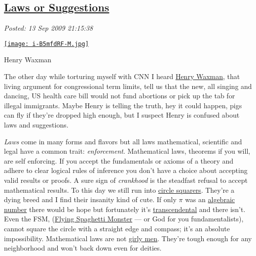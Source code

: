 %

\subsection*{\href{https://bakerjd99.wordpress.com/2009/09/13/laws-or-suggestions/}{Laws or Suggestions}}


\noindent\emph{Posted: 13 Sep 2009 21:15:38}
\vspace{6pt}


\captionsetup[floatingfigure]{labelformat=empty}
\begin{floatingfigure}[l]{0.25\textwidth}
\centering
\href{http://www.toonpool.com/cartoons/Henry\%20A.\%20Waxman\_28470}{\texttt{[image: i-B5mfdRF-M.jpg]}}
\caption{Henry  Waxman}
\label{fig:61X0}
\end{floatingfigure}
The other day while torturing myself with CNN I heard
\href{http://waxman.house.gov/}{Henry Waxman}, that living argument for
congressional term limits, tell us that the new, all singing and
dancing, US health care bill would not fund abortions or pick up the tab
for illegal immigrants. Maybe Henry is telling the truth, hey it could
happen, pigs can fly if they're dropped high enough, but I suspect Henry
is confused about laws and suggestions.

\emph{Laws} come in many forms and flavors but all laws mathematical,
scientific and legal have a common trait: \emph{enforcement}.
Mathematical laws, theorems if you will, are self enforcing. If you
accept the fundamentals or axioms of a theory and adhere to clear
logical rules of inference you don't have a choice about accepting valid
results or proofs. A sure sign of \emph{crankhood} is the steadfast
refusal to accept mathematical results. To this day we still run into
\href{http://en.wikipedia.org/wiki/Squaring\_the\_circle}{circle
squarers}. They're a dying breed and I find their insanity kind of cute.
If only $\pi$ was an
\href{http://mathworld.wolfram.com/AlgebraicNumber.html}{algebraic
number} there would be hope but fortunately it's
\href{http://sprott.physics.wisc.edu/Pickover/trans.html}{transcendental} and
there isn't. Even the FSM, (\href{http://www.venganza.org/}{Flying
Spaghetti Monster} --- or God for you fundamentalists), cannot square
the circle with a straight edge and compass; it's an absolute
impossibility. Mathematical laws are not
\href{http://www.telegraph.co.uk/news/uknews/1559749/Girly-men-are-perfect-partners-say-women.html}{girly
men}. They're tough enough for any neighborhood and won't back down even
for deities.


